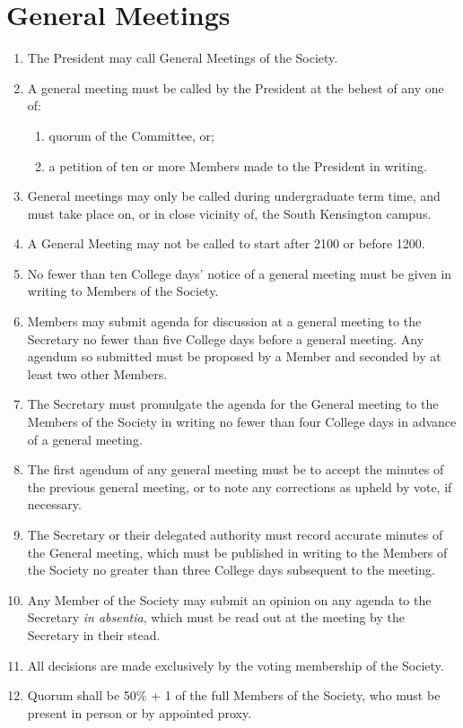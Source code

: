 \documentclass[a4paper]{tufte-handout}
\newcommand{\policyOffset}{12pt}
\newcommand{\policyCspp}[2][\policyOffset]{\marginnote[#1]{\textsc{CSP Policy \S#2}}}
\newcommand{\policyBye}[2][\policyOffset]{\marginnote[#1]{\textsc{Bye-laws \S#2}}}
\begin{document}
\section{General Meetings}
\begin{enumerate}[resume]
    \item The President may call General Meetings of the Society.
    \item \policyCspp{74} A general meeting must be called by the President at the behest of any one of:
        \begin{enumerate}           
            \item quorum of the Committee, or;
            \item a petition of ten or more Members made to the President in writing.
        \end{enumerate}
    \item General meetings may only be called during undergraduate term time, and must take place on, or in close vicinity of, the South Kensington campus.
    \item A General Meeting may not be called to start after 2100 or before 1200.
    \item No fewer than ten College days' notice of a general meeting must be given in writing to Members of the Society.
    \item Members may submit agenda for discussion at a general meeting to the Secretary no fewer than five College days before a general meeting. Any agendum so submitted must be proposed by a Member and seconded by at least two other Members.
    \item The Secretary must promulgate the agenda for the General meeting to the Members of the Society in writing no fewer than four College days in advance of a general meeting.
    \item The first agendum of any general meeting must be to accept the minutes of the previous general meeting, or to note any corrections as upheld by vote, if necessary.
    \item The Secretary or their delegated authority must record accurate minutes of the General meeting, which must be published in writing to the Members of the Society no greater than three College days subsequent to the meeting.
    \item Any Member of the Society may submit an opinion on any agenda to the Secretary \textit{in absentia}, which must be read out at the meeting by the Secretary in their stead.
    \item All decisions are made exclusively by the voting membership of the Society.
    \item \policyBye{B11} Quorum shall be 50\% + 1 of the full Members of the Society, who must be present in person or by appointed proxy.
\end{enumerate}
\end{document}
